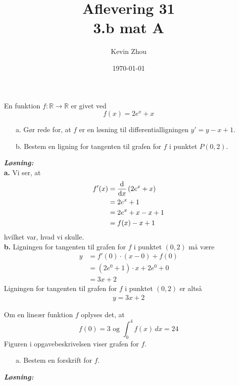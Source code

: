 \documentclass{article}
\title{Aflevering 31\\
{\Large \textbf{3.b mat A}}}
\author{Kevin Zhou}
\date{\today}
\newcommand{\sol}{\setlength{\parindent}{0cm}\textbf{\textit{Løsning:}}\setlength{\parindent}{1cm}}
\begin{document}
\maketitle
\pagebreak
\begin{question}{}{}
  En funktion $f:\mathbb{R}\to \mathbb{R}$ er givet ved
  \[
  f(x)= 2 e^{x} +x
  \] 
  \begin{itemize}
    \item[a.] Gør rede for, at $f$ er en løsning til differentialligningen $y'=y-x+1$. 
    \item[b.] Bestem en ligning for tangenten til grafen for $f$ i punktet $P(0,2)$. 
  \end{itemize}
\end{question}
\sol \\
\textbf{a.}
Vi ser, at
\begin{equation*}
\begin{split}
  f'(x)&=\dv{x} \left(2 e^{x} +x\right) \\ 
  &=2 e^{x} +1\\
  &=2 e^{x} +x -x+1 \\ 
  &=f(x)-x+1
\end{split}
\end{equation*}
hvilket var, hvad vi skulle. \\[1ex]
\textbf{b.}
Ligningen for tangenten til grafen for $f$ i punktet $(0,2)$ må være
\begin{equation*}
\begin{split}
  y&=f'(0) \cdot \left(x-0\right) + f(0)\\ 
  &=(2 e^{0} +1) \cdot x + 2 e^{0} + 0\\ 
  &=3x+2
\end{split}
\end{equation*}
Ligningen for tangenten til grafen for $f$ i punktet $(0,2)$ er altså 
\begin{equation*}
\begin{split}
  y=3x+2
\end{split}
\end{equation*}
\begin{question}{}{}
  Om en lineær funktion $f$ oplyses det, at 
  \[
  f(0)= 3 \text{ og }  \int_{0}^{4} f(x) \,dx =24
  \] 
  Figuren i opgavebeskrivelsen viser grafen for $f$.
  \begin{itemize}
    \item[a.] Bestem en forskrift for $f$.
  \end{itemize}
\end{question}
\sol \\
\end{document}

